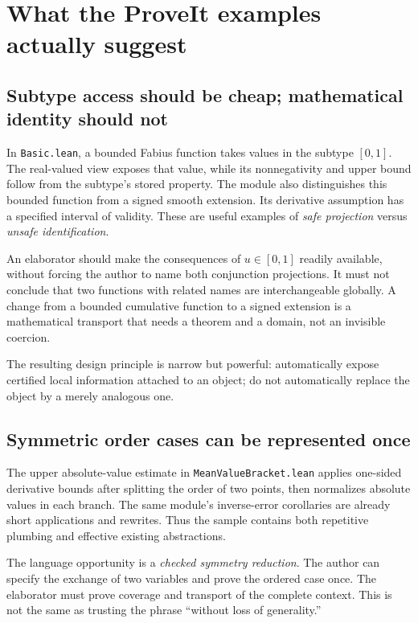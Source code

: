 \documentclass[11pt,a4paper]{article}
\newcommand{\code}[1]{\nolinkurl{#1}}
\theoremstyle{definition}
\theoremstyle{remark}
\numberwithin{equation}{section}
\begin{document}
\section{What the ProveIt examples actually suggest}
\label{sec:diagnosis}
\subsection{Subtype access should be cheap; mathematical identity should not}
In \code{Basic.lean}, a bounded Fabius function takes values in the subtype $[0,1]$. The real-valued view exposes that value, while its nonnegativity and upper bound follow from the subtype's stored property. The module also distinguishes this bounded function from a signed smooth extension. Its derivative assumption has a specified interval of validity. These are useful examples of \emph{safe projection} versus \emph{unsafe identification}.\cite{p-basic}

An elaborator should make the consequences of $u\in[0,1]$ readily available, without forcing the author to name both conjunction projections. It must not conclude that two functions with related names are interchangeable globally. A change from a bounded cumulative function to a signed extension is a mathematical transport that needs a theorem and a domain, not an invisible coercion.

The resulting design principle is narrow but powerful: automatically expose certified local information attached to an object; do not automatically replace the object by a merely analogous one.

\subsection{Symmetric order cases can be represented once}
The upper absolute-value estimate in \code{MeanValueBracket.lean} applies one-sided derivative bounds after splitting the order of two points, then normalizes absolute values in each branch. The same module's inverse-error corollaries are already short applications and rewrites. Thus the sample contains both repetitive plumbing and effective existing abstractions.\cite{p-mean}

The language opportunity is a \emph{checked symmetry reduction}. The author can specify the exchange of two variables and prove the ordered case once. The elaborator must prove coverage and transport of the complete context. This is not the same as trusting the phrase ``without loss of generality.''
\end{document}
